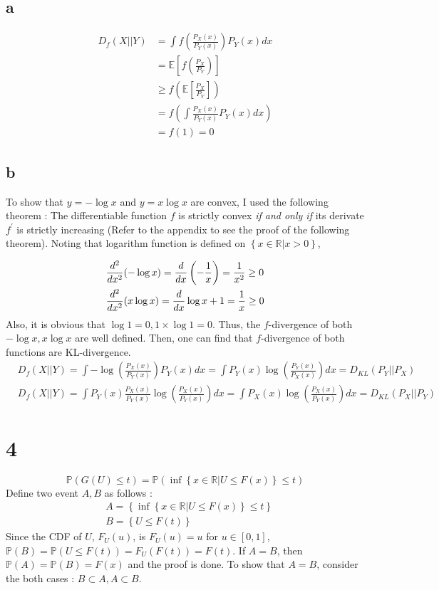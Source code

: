\documentclass[10pt]{article}
\begin{document}
\subsection*{a}
\begin{align*}
    D_f(X||Y) &= \int f\left(\frac{P_X(x)}{P_Y(x)}\right)P_Y(x) dx \\ 
    &= \mathbb{E}\left[f\left(\frac{P_X}{P_Y}\right)\right] \\
    & \ge f\left(\mathbb{E}\left[\frac{P_X}{P_Y}\right]\right) \\ 
    &= f\left(\int\frac{P_X(x)}{P_Y(x)}P_Y(x) dx \right) \\
    &= f(1) = 0 
\end{align*}
\subsection*{b}
To show that $y = -\log x$ and $y = x\log x$ are convex, I used the following theorem : The differentiable function $f$ is strictly convex \textit{if and only if} its derivate $f^\prime$ is strictly increasing
(Refer to the appendix to see the proof of the following theorem). Noting that logarithm function is defined on $\left\{x\in \mathbb{R}|x>0\right\}$, 

\begin{align*}
    &{d^2\over dx^2}(-\log x) = {d\over dx} \left(-\frac{1}{x}\right) =  \frac{1}{x^2} \ge 0\\
    &{d^2\over dx^2}(x\log x) = {d\over dx} \log x + 1 = \frac{1}{x} \ge 0
\end{align*}
Also, it is obvious that $\log 1 = 0, 1\times \log 1 = 0$. Thus, the $f$-divergence of both $-\log x, x\log x$ are well defined. 
Then, one can find that $f$-divergence of both functions are KL-divergence.
\begin{align*}
    &D_f(X||Y) = \int -\log\left(\frac{P_X(x)}{P_Y(x)}\right)P_Y(x) dx  = \int P_Y(x)\log\left(\frac{P_Y(x)}{P_X(x)}\right)dx = D_{KL}\left(P_Y || P_X\right) \\
    &D_f(X||Y) = \int P_Y(x)\frac{P_X(x)}{P_Y(x)}\log\left(\frac{P_X(x)}{P_Y(x)}\right)dx = \int P_X(x)\log\left(\frac{P_X(x)}{P_Y(x)}\right) dx = D_{KL}(P_X||P_Y)
\end{align*}
\section*{4}
\begin{equation*}
    \mathbb{P}(G(U)\le t) = \mathbb{P}\left(\inf \left\{x\in \mathbb{R}|U\le F(x)\right\}\le t\right)
\end{equation*}
Define two event $A,B$ as follows : 
\begin{align*}
    &A = \left\{\inf \left\{x\in \mathbb{R}|U\le F(x)\right\}\le t\right\} \\
    &B = \left\{U\le F(t)\right\}
\end{align*}
Since the CDF of $U$, $F_U(u)$, is $F_U(u) = u$ for $u \in [0,1]$, $\mathbb{P}(B) = \mathbb{P}(U\le F(t)) = F_U(F(t)) = F(t)$.
If $A = B$, then $\mathbb{P}(A) = \mathbb{P}(B) = F(x)$ and the proof is done. To show that $A = B$, consider the both cases : $B \subset A, A \subset B$.
\end{document}
